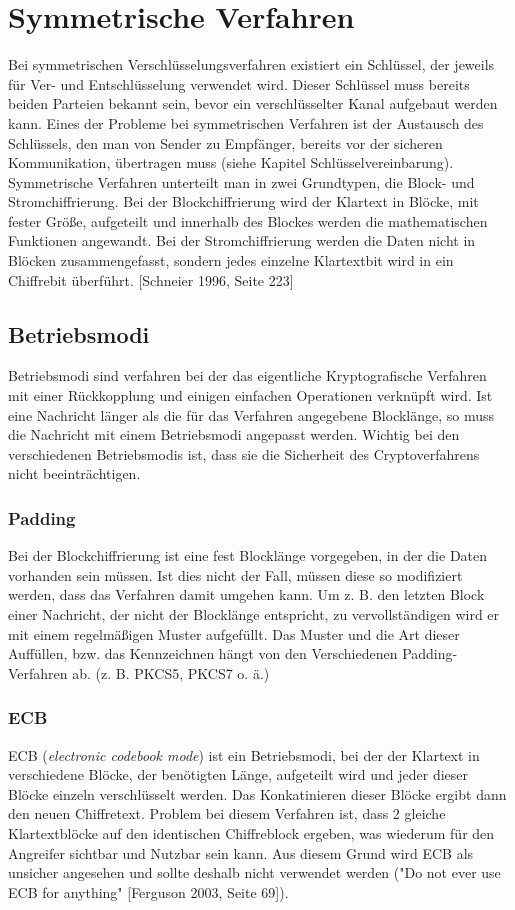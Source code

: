 \documentclass[10pt, a4paper]{scrreprt}
\begin{document}
\section{Symmetrische Verfahren}
Bei symmetrischen Verschlüsselungsverfahren existiert ein Schlüssel, der jeweils für Ver- und Entschlüsselung verwendet wird. Dieser Schlüssel muss bereits beiden Parteien bekannt sein, bevor ein verschlüsselter Kanal aufgebaut werden kann. Eines der Probleme bei symmetrischen Verfahren ist der Austausch des Schlüssels, den man von Sender zu Empfänger, bereits vor der sicheren Kommunikation, übertragen muss (siehe Kapitel Schlüsselvereinbarung). Symmetrische Verfahren unterteilt man in zwei Grundtypen, die Block- und Stromchiffrierung. Bei der Blockchiffrierung wird der Klartext in Blöcke, mit fester Größe, aufgeteilt und innerhalb des Blockes werden die mathematischen Funktionen angewandt. Bei der Stromchiffrierung werden die Daten nicht in Blöcken zusammengefasst, sondern jedes einzelne Klartextbit wird in ein Chiffrebit überführt. [Schneier 1996, Seite 223] 

\subsection{Betriebsmodi}
Betriebsmodi sind verfahren bei der das eigentliche Kryptografische Verfahren mit einer Rückkopplung und einigen einfachen Operationen verknüpft wird. Ist eine Nachricht länger als die für das Verfahren angegebene Blocklänge, so muss die Nachricht mit einem Betriebsmodi angepasst werden. Wichtig bei den verschiedenen Betriebsmodis ist, dass sie die Sicherheit des Cryptoverfahrens nicht beeinträchtigen.

\subsubsection{Padding}
Bei der Blockchiffrierung ist eine fest Blocklänge vorgegeben, in der die Daten vorhanden sein müssen. Ist dies nicht der Fall, müssen diese so modifiziert werden, dass das Verfahren damit umgehen kann.
Um z. B. den letzten Block einer Nachricht, der nicht der Blocklänge entspricht, zu vervollständigen wird er mit einem regelmäßigen Muster aufgefüllt. Das Muster und die Art dieser Auffüllen, bzw. das Kennzeichnen hängt von den Verschiedenen Padding-Verfahren ab. (z. B. PKCS5, PKCS7 o. ä.)

\subsubsection{ECB}
ECB (\textit{electronic codebook mode}) ist ein Betriebsmodi, bei der der Klartext in verschiedene Blöcke, der benötigten Länge, aufgeteilt wird und jeder dieser Blöcke einzeln verschlüsselt werden. Das Konkatinieren dieser Blöcke ergibt dann den neuen Chiffretext. Problem bei diesem Verfahren ist, dass 2 gleiche Klartextblöcke auf den identischen Chiffreblock ergeben, was wiederum für den Angreifer sichtbar und Nutzbar sein kann. Aus diesem Grund wird ECB als unsicher angesehen und sollte deshalb nicht verwendet werden ("Do not ever use ECB for anything" [Ferguson 2003, Seite 69]).
\end{document}
